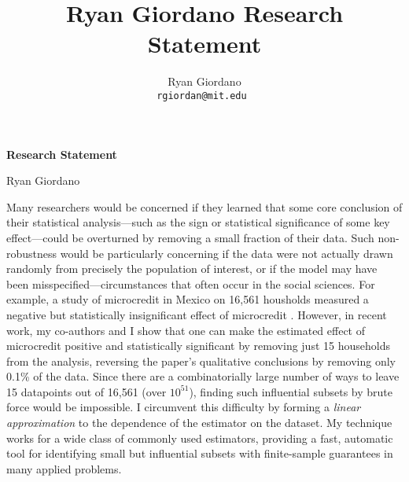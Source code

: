 
\usepackage{enumitem}

\usepackage{geometry}
\geometry{top=1.0in}
\geometry{left=1.3in}
\geometry{right=1.3in}

\title{Ryan Giordano Research Statement}

\author{
  Ryan Giordano \\ \texttt{rgiordan@mit.edu }
}



\begin{minipage}[t]{0.5\textwidth}
\hspace{-2em} %
{\bf \LARGE Research Statement}\\
\end{minipage}
\begin{minipage}[t]{0.5\textwidth}
        \hspace{8em} %
        {\LARGE Ryan Giordano}
\end{minipage}

Many researchers would be concerned if they learned that some core conclusion of
their statistical analysis---such as the sign or statistical significance of
some key effect---could be overturned by removing a small fraction of their
data. Such non-robustness would be particularly concerning if the data were not
actually drawn randomly from precisely the population of interest, or if the
model may have been misspecified---circumstances that often occur in the social
sciences. For example, a study of microcredit in Mexico on 16,561 housholds
measured a negative but statistically insignificant effect of microcredit
\citep{angelucci:2015:microcredit}.  However, in recent work, my co-authors and
I show that one can make the estimated effect of microcredit positive and
statistically significant by removing just 15 households from the analysis,
reversing the paper's qualitative conclusions by removing only 0.1\% of the
data.  Since there are a combinatorially large number of ways to leave 15
datapoints out of 16,561 (over $10^{51}$), finding such influential subsets by
brute force would be impossible.  I circumvent this difficulty by forming a
\emph{linear approximation} to the dependence of the estimator on the dataset.
My technique works for a wide class of commonly used estimators, providing a
fast, automatic tool for identifying small but influential subsets with
finite-sample guarantees in many applied problems.

